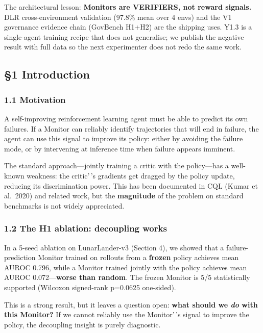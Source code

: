 \documentclass[
]{article}
\begin{document}
The architectural lesson: \textbf{Monitors are VERIFIERS, not reward
signals.} DLR cross-environment validation (97.8\% mean over 4 envs) and
the V1 governance evidence chain (GovBench H1+H2) are the shipping uses.
Y1.3 is a single-agent training recipe that does not generalise; we
publish the negative result with full data so the next experimenter does
not redo the same work.

\subsection{§1 Introduction}\label{introduction}

\subsubsection{1.1 Motivation}\label{motivation}

A self-improving reinforcement learning agent must be able to predict
its own failures. If a Monitor can reliably identify trajectories that
will end in failure, the agent can use this signal to improve its
policy: either by avoiding the failure mode, or by intervening at
inference time when failure appears imminent.

The standard approach---jointly training a critic with the policy---has
a well-known weakness: the critic'\,'s gradients get dragged by the
policy update, reducing its discrimination power. This has been
documented in CQL (Kumar et al.~2020) and related work, but the
\textbf{magnitude} of the problem on standard benchmarks is not widely
appreciated.

\subsubsection{1.2 The H1 ablation: decoupling
works}\label{the-h1-ablation-decoupling-works}

In a 5-seed ablation on LunarLander-v3 (Section 4), we showed that a
failure-prediction Monitor trained on rollouts from a \textbf{frozen}
policy achieves mean AUROC 0.796, while a Monitor trained jointly with
the policy achieves mean AUROC 0.072---\textbf{worse than random}. The
frozen Monitor is 5/5 statistically supported (Wilcoxon signed-rank
p=0.0625 one-sided).

This is a strong result, but it leaves a question open: \textbf{what
should we \emph{do} with this Monitor?} If we cannot reliably use the
Monitor'\,'s signal to improve the policy, the decoupling insight is
purely diagnostic.
\end{document}
